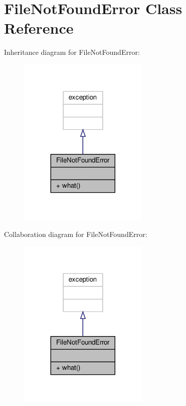 \hypertarget{classFileNotFoundError}{}\section{File\+Not\+Found\+Error Class Reference}
\label{classFileNotFoundError}


Inheritance diagram for File\+Not\+Found\+Error\+:
\nopagebreak
\begin{figure}[H]
\begin{center}
\leavevmode
\includegraphics[width=176pt]{classFileNotFoundError__inherit__graph}
\end{center}
\end{figure}


Collaboration diagram for File\+Not\+Found\+Error\+:
\nopagebreak
\begin{figure}[H]
\begin{center}
\leavevmode
\includegraphics[width=176pt]{classFileNotFoundError__coll__graph}
\end{center}
\end{figure}
